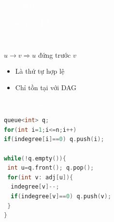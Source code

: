 \documentclass{beamer}
\newcommand{\hlblue}[1]{\textcolor{myblue}{#1}}
\newcommand{\hlwhite}[1]{\textcolor{white}{#1}}
\begin{document}

\begin{frame}{\hlwhite{Ví dụ DAG}}
\centering
{}
\end{frame}

\begin{frame}{\hlwhite{Không phải DAG}}
\centering
{}
\end{frame}


\begin{frame}{\hlwhite{Topological Sort}}
\begin{tcolorbox}
\centering
\hlblue{$u \rightarrow v \Rightarrow u$ đứng trước $v$}
\end{tcolorbox}

\begin{itemize}
\item Là thứ tự hợp lệ
\item Chỉ tồn tại với DAG
\end{itemize}
\end{frame}

\begin{frame}[fragile]{\hlwhite{Topo Sort (Kahn)}}
\begin{lstlisting}[language=C++]
queue<int> q;
for(int i=1;i<=n;i++)
if(indegree[i]==0) q.push(i);

while(!q.empty()){
 int u=q.front(); q.pop();
 for(int v: adj[u]){
  indegree[v]--;
  if(indegree[v]==0) q.push(v);
 }
}
\end{lstlisting}
\end{frame}
\end{document}
